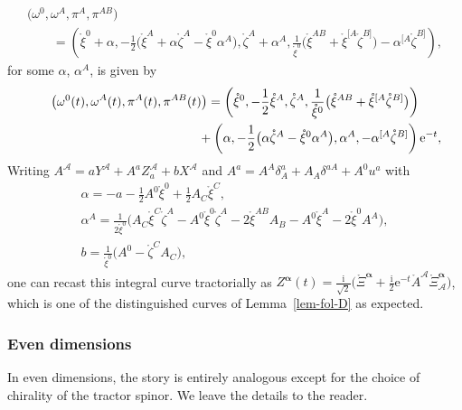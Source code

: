 \documentclass[pdftex]{sigma}
\numberwithin{equation}{section}
\newcommand{\mc} [1]{\mathcal{#1}}
\newcommand{\ii} {\mathrm{i}}
\newcommand{\ee} {\mathrm{e}}
\newcommand{\mr}[1] {\mathring{#1}}
\begin{document}
\begin{gather*}
\big( \omega^0 , \omega^A , \pi^A , \pi^{AB} \big)\\
\qquad{} = \left( \mr{\xi}^0 + \alpha ,
- \frac{1}{2} \big( \mr{\xi}^A + \alpha \mr{\zeta}^A - \mr{\xi}^0 \alpha^A \big) ,
\mr{\zeta}^A + \alpha^A , \frac{1}{\mr{\xi}^0} \big( \mr{\xi}^{AB} + \mr{\xi}^{[A} \mr{\zeta}^{B]} \big) - \alpha^{[A} \mr{\zeta}^{B]} \right) ,
\end{gather*}
for some $\alpha$, $\alpha^A$, is given by
\begin{gather*}
\big( \omega^0 (t), \omega^A (t), \pi^A (t), \pi^{AB} (t)\big) = \left( \mr{\xi}^0 ,- \frac{1}{2} \mr{\xi}^A ,
\mr{\zeta}^A , \frac{1}{\mr{\xi}^0} \big( \mr{\xi}^{AB} + \mr{\xi}^{[A} \mr{\zeta}^{B]} \big) \right) \\
\hphantom{\big( \omega^0 (t), \omega^A (t), \pi^A (t), \pi^{AB} (t)\big) =}{}
+ \left( \alpha ,- \frac{1}{2} \big( \alpha \mr{\zeta}^A - \mr{\xi}^0 \alpha^A \big) ,
 \alpha^A , - \alpha^{[A} \mr{\zeta}^{B]} \right) \ee^{-t} ,
\end{gather*}
Writing $A^\mc{A} = a Y^\mc{A} + A^a Z_a^\mc{A} + b X^\mc{A}$ and $A^a = A^A \delta_A^a + A_A \delta^{aA} + A^0 u^a$ with
\begin{gather*}
\alpha = -a - \frac{1}{2}A^0 \mr{\xi}^0 + \frac{1}{2} A_C \mr{\xi}^C , \\
\alpha^A = \frac{1}{2 \mr{\xi}^0} \big( A_C \mr{\xi}^C \mr{\zeta}^A - A^0 \mr{\xi}^0 \mr{\zeta}^A - 2 \mr{\xi}^{AB} A_B - A^0 \mr{\xi}^A - 2 \mr{\xi}^0 A^A \big) , \\
b = \frac{1}{\mr{\xi}^0} \big(A^0 - \mr{\zeta}^C A_C \big) ,
\end{gather*}
one can recast this integral curve tractorially as $Z^{\bm{\upalpha}} (t) = \frac{\ii}{\sqrt{2}} \big( \mr{\Xi}^{\bm{\upalpha}} + \frac{\ii}{2} \ee^{-t} \mr{A}^{\mc{A}} \mr{\Xi}^{\bm{\upalpha}}_{\mc{A}} \big)$, which is one of the distinguished curves of Lemma~\ref{lem-fol-D} as expected.

\subsubsection{Even dimensions}
In even dimensions, the story is entirely analogous except for the choice of chirality of the tractor spinor. We leave the details to the reader.
\end{document}
